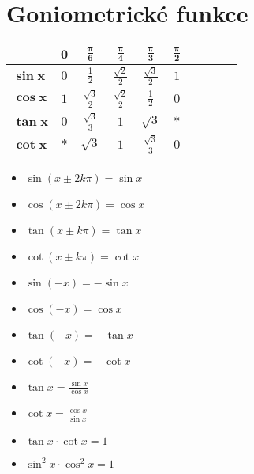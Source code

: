\documentclass{article}
\newcommand{\mbf}[1]{\mathbf{#1}}
\begin{document}
	\section*{Goniometrické funkce}
	\begin{multicols}{4}
		\begingroup
			\centering
			\renewcommand{\arraystretch}{1.55}
			\begin{tabular}{p{1.5em}|ccccccccc}
												&	$\mbf{0}$	&	$\mbf{\frac{\pi}{6}}$	&	$\mbf{\frac{\pi}{4}}$	&	$\mbf{\frac{\pi}{3}}$	&	$\mbf{\frac{\pi}{2}}$	\\\hline
				$\mbf{\sin{x}}$	&	$0$				&	$\frac{1}{2}$					&	$\frac{\sqrt{2}}{2}$	&	$\frac{\sqrt{3}}{2}$	&	$1$										\\
				$\mbf{\cos{x}}$	&	$1$				&	$\frac{\sqrt{3}}{2}$	&	$\frac{\sqrt{2}}{2}$	&	$\frac{1}{2}$					&	$0$										\\
				$\mbf{\tan{x}}$	&	$0$				&	$\frac{\sqrt{3}}{3}$	&	$1$										&	$\sqrt{3}$						&	$*$										\\
				$\mbf{\cot{x}}$	&	$*$				&	$\sqrt{3}$						&	$1$										&	$\frac{\sqrt{3}}{3}$	&	$0$										\\
			\end{tabular}
		\endgroup
		\columnbreak
		\begin{itemize}
		\begingroup
			\item $\sin{(x \pm 2k\pi)} = \sin{x}$
			\item $\cos{(x \pm 2k\pi)} = \cos{x}$
			\item $\tan{(x \pm k\pi)} = \tan{x}$
			\item $\cot{(x \pm k\pi)} = \cot{x}$
		\columnbreak
			\item $\sin{(-x)} = -\sin{x}$
			\item $\cos{(-x)} = \cos{x}$
			\item $\tan{(-x)} = -\tan{x}$
			\item $\cot{(-x)} = -\cot{x}$
		\columnbreak
			\item $\tan{x} = \frac{\sin{x}}{\cos{x}}$
			\item $\cot{x} = \frac{\cos{x}}{\sin{x}}$
			\item $\tan{x} \cdot \cot{x} = 1$
			\item $\sin^{2}{x} \cdot \cos^{2}{x} = 1$
		\endgroup
		\end{itemize}
	\end{multicols}

\pagebreak
\end{document}
